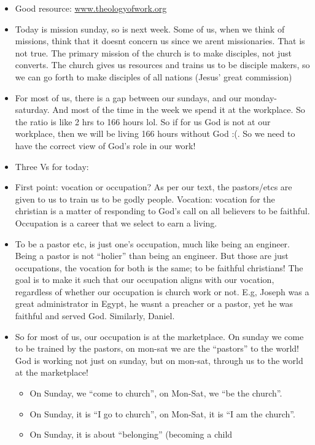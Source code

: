 \begin{itemize}
  \item{Good resource: \url{www.theologyofwork.org}}
  \item{Today is mission sunday, so is next week. Some of us, when we think
  of missions, think that it doesnt concern us since we arent missionaries.
  That is not true. The primary mission of the church is to make disciples,
  not just converts. The church gives us resources and trains us to be
  disciple makers, so we can go forth to make disciples of all nations
  (Jesus’ great commission)}
  \item{For most of us, there is a gap between our sundays, and our
  monday-saturday. And most of the time in the week we spend it at the
  workplace. So the ratio is like 2 hrs to 166 hours lol. So if for us God is
  not at our workplace, then we will be living 166 hours without God :(. So we need to have the correct view of God’s role in our work!}
  \item{Three Vs for today:}
  \item{First point: vocation or occupation? As per our text, the
  pastors/etcs are given to us to train us to be godly people. Vocation:
  vocation for the christian is a matter of responding to God’s call on all
  believers to be faithful. Occupation is a career that we select to earn a
  living.}
  \item{To be a pastor etc, is just one’s occupation, much like being an
  engineer. Being a pastor is not “holier” than being an engineer. But those
  are just occupations, the vocation for both is the same; to be faithful
  christians! The goal is to make it such that our occupation aligns with our
  vocation, regardless of whether our occupation is church work or not. E.g,
  Joseph was a great administrator in Egypt, he wasnt a preacher or a pastor,
  yet he was faithful and served God. Similarly, Daniel. }
  \item{So for most of us, our occupation is at the marketplace. On sunday we
  come to be trained by the pastors, on mon-sat we are the “pastors” to the
  world! God is working not just on sunday, but on mon-sat, through us to the
  world at the marketplace!
  \begin{itemize}
    \item{On Sunday, we ``come to church'', on Mon-Sat, we ``be the
    church''.}
    \item{On Sunday, it is ``I go to church'', on Mon-Sat, it is ``I am the
    church''.}
    \item{On Sunday, it is about ``belonging'' (becoming a child
}
\end{itemize}}
\end{itemize}
